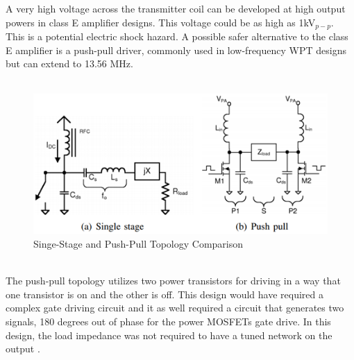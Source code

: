 \documentclass[12pt]{article}
\begin{document}
\indent
A very high voltage across the transmitter coil can be developed at high output powers in class E amplifier designs. This voltage could be as high as 1kV$_{p-p}$. This is a potential electric shock hazard. A possible safer alternative to the class E amplifier is a push-pull driver, commonly used in low-frequency WPT designs but can extend to 13.56 MHz.\\
\hfill \\
\begin{figure}[h!]
\centering
\includegraphics[width=0.9\linewidth]{circ_push_pull}
\caption{Singe-Stage and Push-Pull Topology Comparison \cite{ecceHarmonicFiltered}}
\end{figure}
\hfill \\
\indent
The push-pull topology utilizes two power transistors for driving in a way that one transistor is on and the other is off. This design would have required a complex gate driving circuit and it as well required a circuit that generates two signals, 180 degrees out of phase for the power MOSFETs gate drive. In this design, the load impedance was not required to have a tuned network on the output \cite{ecceHarmonicFiltered}.\\
\end{document}
